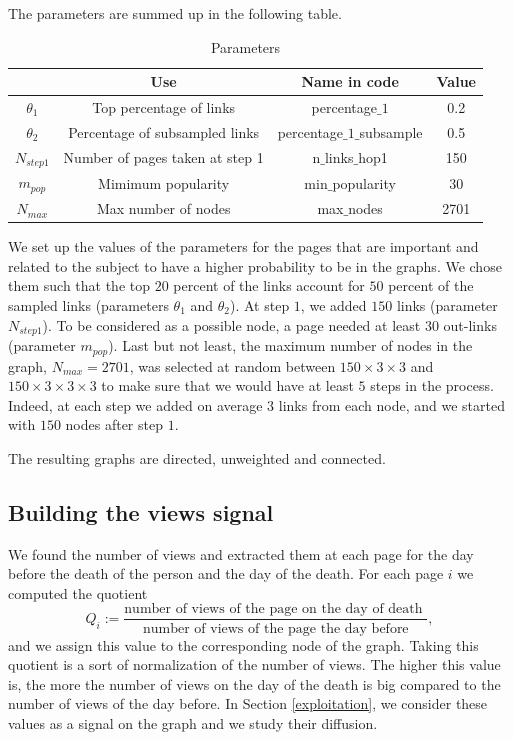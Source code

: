\documentclass[conference]{IEEEtran}
\begin{document}
\medskip 

The parameters are summed up in the following table. 

\begin{table}[htbp]
\caption{Parameters}
\begin{center}
\begin{tabular}{|c|c|c|c|}
\hline
 & Use & Name in code & Value \\
\hline
$\theta_1$& Top  percentage of links  & percentage$\_1$ & 0.2 \\
\hline
$\theta_2$& Percentage of subsampled links &  percentage$\_1\_$subsample &  0.5\\
\hline
$N_{step1}$  &  Number of pages taken at step 1   & n$\_$links$\_$hop1  & 150  \\
\hline
$m_{pop}$  & Mimimum popularity  & min$\_$popularity &30 \\
\hline
$N_{max}$  &  Max number of nodes & max$\_$nodes&  2701 \\
\hline
\end{tabular}
\end{center}
\end{table}

We set up the values of the parameters for the pages that are important and related to the subject to have a higher probability to be in the graphs. We chose them such that the top $20$ percent of the links account for $50$ percent of the sampled links (parameters $\theta_1$ and $\theta_2$). At step $1$, we added $150$ links (parameter $N_{step1}$). To be considered as a possible node, a page needed at least $30$ out-links (parameter $m_{pop}$). Last but not least, the maximum number of nodes in the graph, $N_{max}=2701$, was selected at random between $150 \times 3 \times 3$ and $150 \times 3 \times 3 \times 3$ to make sure that we would have at least $5$ steps in the process. Indeed, at each step we added on average $3$ links from each node, and we started with $150$ nodes after step $1$.


\medskip

The resulting graphs are directed, unweighted and connected. 

\subsection{Building the views signal}
We found the number of views and extracted them at each page for the day before the death of the person and the day of the death. 
For each page $i$  we computed the quotient  \[Q_i:=\frac{\text{number of views of the page on the day of death }}{\text{number of views of the page the day before}},\] and we assign this value to the corresponding node of the graph. Taking this quotient is a sort of normalization of the number of views. The higher this value is, the more the number of views on the day of the death is big compared to the number of views of the day before.  In Section \ref{exploitation}, we consider these values as a signal on the graph and we study their diffusion. 
\end{document}
